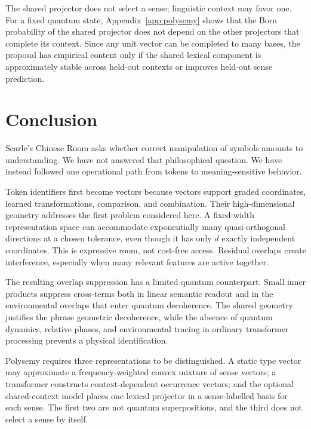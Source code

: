 \documentclass[
  aps,
  reprint,
  superscriptaddress,
  floatfix,
  nofootinbib,
  longbibliography
]{revtex4-2}
\begin{document}
The shared projector does not select a sense; linguistic context may favor
one.  For a fixed quantum state, Appendix~\ref{app:polysemy} shows that the
Born probability of the shared projector does not depend on the other
projectors that complete its context.  Since any unit vector can be completed
to many bases, the proposal has empirical content only if the shared lexical
component is approximately stable across held-out contexts or improves
held-out sense prediction.
\section{Conclusion}
\label{sec:conclusion}

Searle's Chinese Room asks whether correct manipulation of symbols amounts to
understanding.  We have not answered that philosophical question.  We have
instead followed one operational path from tokens to meaning-sensitive
behavior.

Token identifiers first become vectors because vectors support graded
coordinates, learned transformations, comparison, and combination.  Their
high-dimensional geometry addresses the first problem considered here.  A
fixed-width representation space can accommodate exponentially many
quasi-orthogonal
directions at a chosen tolerance, even though it has only $d$ exactly
independent coordinates.  This is expressive room, not cost-free access.
Residual overlaps create interference, especially when many relevant features
are active together.

The resulting overlap suppression has a limited quantum counterpart.  Small
inner products suppress cross-terms both in linear semantic readout and in
the environmental overlaps that enter quantum decoherence.  The shared
geometry justifies the phrase geometric decoherence, while the absence of
quantum dynamics, relative phases, and environmental tracing in ordinary
transformer processing prevents a physical identification.

Polysemy requires three representations to be distinguished.  A static type
vector may approximate a frequency-weighted convex mixture of sense vectors;
a transformer constructs context-dependent occurrence vectors; and the
optional shared-context model places one lexical projector in a
sense-labelled basis for each sense.  The first two are not quantum
superpositions, and the third does not select a sense by itself.
\end{document}
